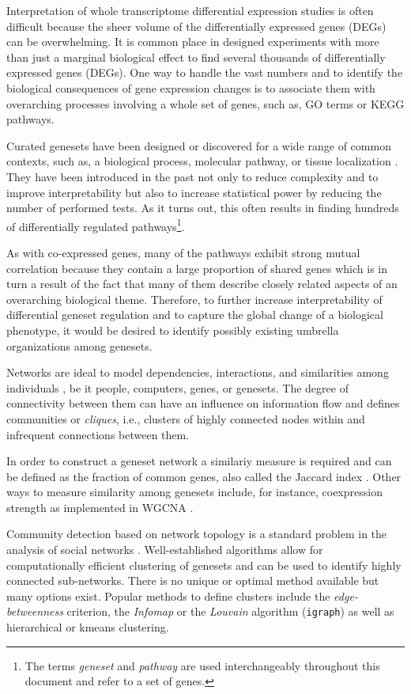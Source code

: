 \documentclass[9pt,a4paper,]{extarticle}
\theoremstyle{definition}
\theoremstyle{definition}
\theoremstyle{definition}
\theoremstyle{remark}
\begin{document}
Interpretation of whole transcriptome differential expression studies is often difficult because the sheer volume of the differentially expressed genes (DEGs) can be overwhelming. It is common place in designed experiments with more than just a marginal biological effect to find several thousands of differentially expressed genes (DEGs). One way to handle the vast numbers and to identify the biological consequences of gene expression changes is to associate them with overarching processes involving a whole set of genes, such as, GO terms or KEGG pathways.

Curated genesets have been designed or discovered for a wide range of common contexts, such as, a biological process, molecular pathway, or tissue localization \citep{Rouillard2016, Liberzon2011}. They have been introduced in the past not only to reduce complexity and to improve interpretability but also to increase statistical power by reducing the number of performed tests. As it turns out, this often results in finding hundreds of differentially regulated pathways\footnote{The terms \emph{geneset} and \emph{pathway} are used interchangeably throughout this document and refer to a set of genes.}.

As with co-expressed genes, many of the pathways exhibit strong mutual correlation because they contain a large proportion of shared genes which is in turn a result of the fact that many of them describe closely related aspects of an overarching biological theme. Therefore, to further increase interpretability of differential geneset regulation and to capture the global change of a biological phenotype, it would be desired to identify possibly existing umbrella organizations among genesets.

Networks are ideal to model dependencies, interactions, and similarities among individuals \citep{Barabasi2004, Vidal2011, Ideker2012}, be it people, computers, genes, or genesets. The degree of connectivity between them can have an influence on information flow and defines communities or \emph{cliques}, i.e., clusters of highly connected nodes within and infrequent connections between them.

In order to construct a geneset network a similariy measure is required and can be defined as the fraction of common genes, also called the Jaccard index \citep{Merico2010}. Other ways to measure similarity among genesets include, for instance, coexpression strength as implemented in WGCNA \citep{Langfelder2008, Thorsson2018}.

Community detection based on network topology is a standard problem in the analysis of social networks \citep{Girvan2002, Bedi2016}. Well-established algorithms allow for computationally efficient clustering of genesets and can be used to identify highly connected sub-networks. There is no unique or optimal method available but many options exist. Popular methods to define clusters include the \emph{edge-betweenness} criterion, the \emph{Infomap} or the \emph{Louvain} algorithm (\texttt{igraph}) as well as hierarchical or kmeans clustering.
\end{document}

